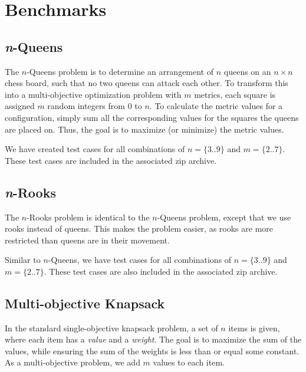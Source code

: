 \documentclass[11pt]{article}
\begin{document}
\section{Benchmarks}\label{sec:benchmarks}

\subsection{\textit{n}-Queens}\label{sec:nqueens}

The $n$-Queens problem is to determine an arrangement of $n$
queens on an $n \times n$ chess board, such that no two queens can
attack each other. To transform this into a multi-objective
optimization problem with $m$ metrics, each square is assigned $m$
random integers from $0$ to $n$. To calculate the metric values for a
configuration, simply sum all the corresponding values for the squares
the queens are placed on. Thus, the goal is to maximize (or minimize)
the metric values.

We have created test cases for all combinations of $n = \{3..9\}$ and
$m = \{2..7\}$. These test cases are included in the associated zip
archive.

\subsection{\textit{n}-Rooks}\label{sec:nrooks}

The $n$-Rooks problem is identical to the $n$-Queens problem, except
that we use rooks instead of queens. This makes the problem easier, as
rooks are more restricted than queens are in their movement.

Similar to $n$-Queens, we have test cases for all combinations of $n =
\{3..9\}$ and $m = \{2..7\}$. These test cases are also included in the
associated zip archive.

\subsection{Multi-objective Knapsack}\label{sec:knapsack}

In the standard single-objective knapsack problem, a set of $n$ items
is given, where each item has a \textit{value} and a \textit{weight}.
The goal is to maximize the sum of the values, while ensuring the sum
of the weights is less than or equal some constant. As a
multi-objective problem, we add $m$ values to each item.
\end{document}
